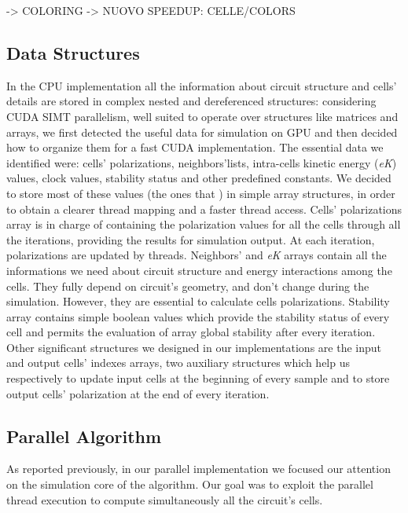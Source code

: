 -> COLORING
-> NUOVO SPEEDUP: CELLE/COLORS

\subsection{Data Structures}
In the CPU implementation all the information about circuit structure and cells' details are stored in complex nested and dereferenced structures:
considering CUDA SIMT parallelism, well suited to operate over structures like matrices and arrays, we first detected the useful data
for simulation on GPU and then decided how to organize them for a fast CUDA implementation.\newline
The essential data we identified were: cells' polarizations, neighbors'lists, intra-cells kinetic energy (\textit{eK}) values, clock values,
stability status and other predefined constants.\newline
We decided to store most of these values (the ones that ) in simple array structures, in order to obtain a clearer thread mapping and a faster thread access.\newline
Cells' polarizations array is in charge of containing the polarization values for all the cells through all the iterations, providing
the results for simulation output. At each iteration, polarizations are updated by threads.\newline
Neighbors' and \textit{eK} arrays contain all the informations we need about circuit structure and energy interactions among
the cells. They fully depend on circuit's geometry, and don't change during the simulation. However, they are essential to calculate 
cells polarizations.\newline
Stability array contains simple boolean values which provide the stability status of every cell and permits the evaluation of array global
stability after every iteration.\newline
Other significant structures we designed in our implementations are the input and output cells' indexes arrays, two auxiliary structures
which help us respectively to update input cells at the beginning of every sample and to store output cells' polarization at the end of 
every iteration.

\subsection{Parallel Algorithm}
As reported previously, in our parallel implementation we focused our attention on the simulation core of the algorithm.\newline
Our goal was to exploit the parallel thread execution to compute simultaneously all the circuit's cells. 

